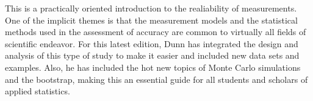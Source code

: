 This is a practically oriented introduction to the realiability of measurements. One of the implicit themes is that the measurement models and the statistical methods used in the assessment of accuracy are common to virtually all fields of scientific endeavor. For this latest edition, Dunn has integrated the design and analysis of this type of study to make it easier and included new data sets and examples. Also, he has included the hot new topics of Monte Carlo simulations and the bootstrap, making this an essential guide for all students and scholars of applied statistics.

